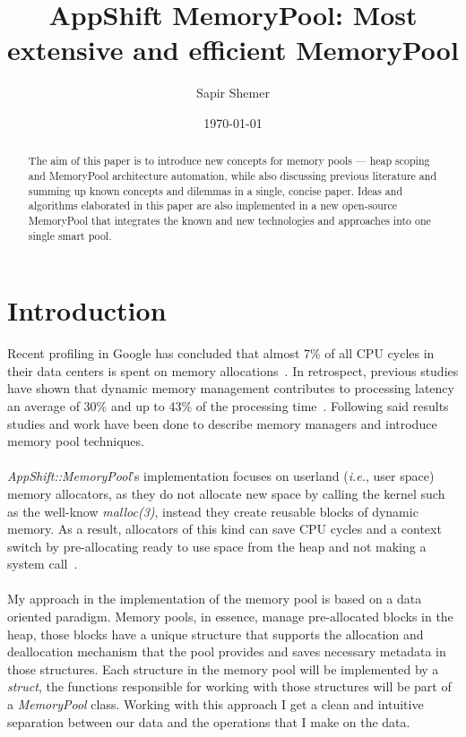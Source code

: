 \documentclass[a4paper, 12pt]{article}
\begin{document}
\title{AppShift MemoryPool: Most extensive and efficient MemoryPool}

\author{Sapir Shemer}
\date{\today}
\maketitle

\begin{abstract}
    The aim of this paper is to introduce new concepts for memory pools --- heap scoping and MemoryPool architecture automation, while also discussing previous literature and summing up known concepts and dilemmas in a single, concise paper.
    Ideas and algorithms elaborated in this paper are also implemented in a new open-source MemoryPool that integrates the known and new technologies and approaches into one single smart pool.
\end{abstract}

\tableofcontents
\newpage
{}

\section{Introduction}
Recent profiling in Google has concluded that almost 7\% of all CPU cycles in their data centers is spent on memory allocations~\cite{GoogleResDM}.
In retrospect, previous studies have shown that dynamic memory management contributes to processing latency an average of 30\% and up to 43\% of the processing time~\cite{DynamicStorage}\cite{10.1145/142181.142200}\cite{CCPPDiff}\cite{PageBasedDynamicMemory}\cite{ReconsideringMemory}.
Following said results studies and work have been done to describe memory managers and introduce memory pool techniques.

\paragraph{}
\textit{AppShift::MemoryPool}'s implementation focuses on userland (\textit{i.e.}, user space) memory allocators, as they do not allocate new space by calling the kernel such as the well-know \textit{malloc(3)}, instead they create reusable blocks of dynamic memory.
As a result, allocators of this kind can save CPU cycles and a context switch by pre-allocating ready to use space from the heap and not making a system call~\cite{LSU3Shell}.

\paragraph{}
My approach in the implementation of the memory pool is based on a data oriented paradigm.
Memory pools, in essence, manage pre-allocated blocks in the heap, those blocks have a unique structure that supports the allocation and deallocation mechanism that the pool provides and saves necessary metadata in those structures.
Each structure in the memory pool will be implemented by a \textit{struct}, the functions responsible for working with those structures will be part of a \textit{MemoryPool} class.
Working with this approach I get a clean and intuitive separation between our data and the operations that I make on the data.
\end{document}
